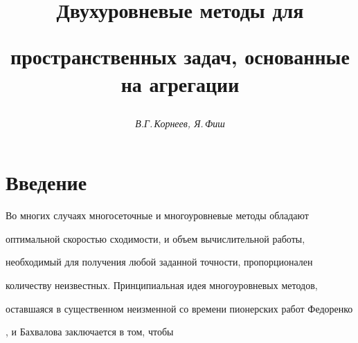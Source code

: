 \setcounter{page}{42}















\author{\it В.Г.\,Корнеев, Я.\,Фиш}




\title{Двухуровневые методы для


пространственных задач, основанные на агрегации}





\date{}




\pagestyle{plain} %







\maketitle


\label{begin}





\section{Введение}





Во многих случаях многосеточные и многоуровневые методы обладают


оптимальной скоростью сходимости, и объем вычислительной работы,


необходимый для получения любой заданной точности, пропорционален


количеству неизвестных. Принципиальная идея многоуровневых методов,


оставшаяся в существенном неизменной со времени пионерских работ Федоренко


\cite{[11]}, \cite{[12]} и Бахвалова \cite{bah} заключается в том, чтобы


